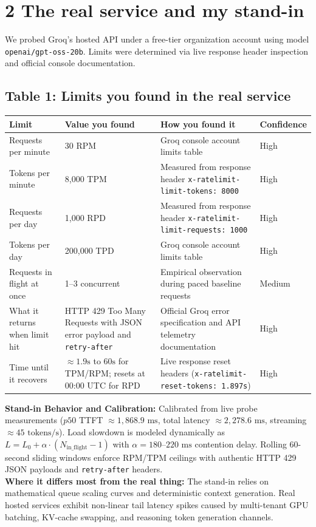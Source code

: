 \documentclass[9pt,a4paper]{article}
\begin{document}
\section*{2 The real service and my stand-in}
We probed Groq's hosted API under a free-tier organization account using model \texttt{openai/gpt-oss-20b}. Limits were determined via live response header inspection and official console documentation.

\subsection*{Table 1: Limits you found in the real service}
\noindent\begin{tabularx}{\textwidth}{l X X l}
\toprule
\textbf{Limit} & \textbf{Value you found} & \textbf{How you found it} & \textbf{Confidence} \\
\midrule
Requests per minute & 30 RPM & Groq console account limits table & High \\
Tokens per minute & 8,000 TPM & Measured from response header \texttt{x-ratelimit-limit-tokens: 8000} & High \\
Requests per day & 1,000 RPD & Measured from response header \texttt{x-ratelimit-limit-requests: 1000} & High \\
Tokens per day & 200,000 TPD & Groq console account limits table & High \\
Requests in flight at once & 1--3 concurrent & Empirical observation during paced baseline requests & Medium \\
What it returns when limit hit & HTTP 429 Too Many Requests with JSON error payload and \texttt{retry-after} & Official Groq error specification and API telemetry documentation & High \\
Time until it recovers & $\approx 1.9\text{s}$ to $60\text{s}$ for TPM/RPM; resets at 00:00 UTC for RPD & Live response reset headers (\texttt{x-ratelimit-reset-tokens: 1.897s}) & High \\
\bottomrule
\end{tabularx}

\vspace{2pt}
\noindent\textbf{Stand-in Behavior and Calibration:} Calibrated from live probe measurements ($p50$ TTFT $\approx 1,868.9\text{ ms}$, total latency $\approx 2,278.6\text{ ms}$, streaming $\approx 45\text{ tokens/s}$). Load slowdown is modeled dynamically as $L = L_0 + \alpha \cdot (N_{\text{in\_flight}} - 1)$ with $\alpha = 180\text{--}220\text{ ms}$ contention delay. Rolling 60-second sliding windows enforce RPM/TPM ceilings with authentic HTTP 429 JSON payloads and \texttt{retry-after} headers.\\
\textbf{Where it differs most from the real thing:} The stand-in relies on mathematical queue scaling curves and deterministic context generation. Real hosted services exhibit non-linear tail latency spikes caused by multi-tenant GPU batching, KV-cache swapping, and reasoning token generation channels.
\end{document}
